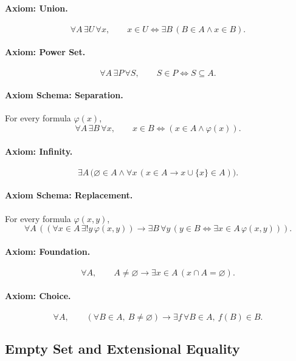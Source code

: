 \paragraph{Axiom: Union.}
\[
  \forall A\,\exists U\,\forall x,\qquad
  x\in U \Longleftrightarrow \exists B\,(B\in A\land x\in B).
\]

\paragraph{Axiom: Power Set.}
\[
  \forall A\,\exists P\,\forall S,\qquad
  S\in P \Longleftrightarrow S\subseteq A.
\]

\paragraph{Axiom Schema: Separation.}
For every formula \(\varphi(x)\),
\[
  \forall A\,\exists B\,\forall x,\qquad
  x\in B \Longleftrightarrow (x\in A\land \varphi(x)).
\]

\paragraph{Axiom: Infinity.}
\[
  \exists A\,
  \bigl(\varnothing\in A
  \land
  \forall x\,(x\in A\to x\cup\{x\}\in A)\bigr).
\]

\paragraph{Axiom Schema: Replacement.}
For every formula \(\varphi(x,y)\),
\[
  \forall A\,
  \left(
  (\forall x\in A\,\exists!y\,\varphi(x,y))
  \to
  \exists B\,\forall y\,
  (y\in B\Longleftrightarrow \exists x\in A\,\varphi(x,y))
  \right).
\]

\paragraph{Axiom: Foundation.}
\[
  \forall A,\qquad
  A\neq\varnothing
  \to
  \exists x\in A\,(x\cap A=\varnothing).
\]

\paragraph{Axiom: Choice.}
\[
  \forall A,\qquad
  (\forall B\in A,\ B\neq\varnothing)
  \to
  \exists f\,\forall B\in A,\ f(B)\in B.
\]

\subsection*{Empty Set and Extensional Equality}

